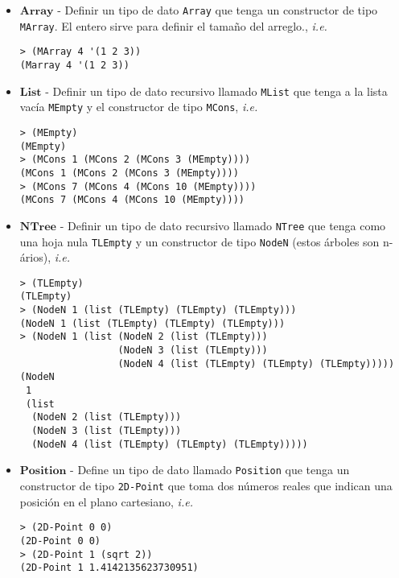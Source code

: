 \documentclass{article}
\begin{document}
\begin{itemize}
\item $\textbf{Array}$ - Definir un tipo de dato \texttt{Array}
  que tenga un constructor de tipo \texttt{MArray}. El entero sirve
  para definir el tamaño del arreglo., \textit{i.e.}
\begin{verbatim}
> (MArray 4 '(1 2 3))
(Marray 4 '(1 2 3))
\end{verbatim}

\item $\textbf{List}$ - Definir un tipo de dato recursivo llamado
  \texttt{MList} que tenga a la lista vacía \texttt{MEmpty} y el
  constructor de tipo \texttt{MCons}, \textit{i.e.}
\begin{verbatim}
> (MEmpty)
(MEmpty)
> (MCons 1 (MCons 2 (MCons 3 (MEmpty))))
(MCons 1 (MCons 2 (MCons 3 (MEmpty))))
> (MCons 7 (MCons 4 (MCons 10 (MEmpty))))
(MCons 7 (MCons 4 (MCons 10 (MEmpty))))
\end{verbatim}

\item $\textbf{NTree}$ - Definir un tipo de dato recursivo llamado
  \texttt{NTree} que tenga como una hoja nula \texttt{TLEmpty} y un
  constructor de tipo \texttt{NodeN} (estos árboles son n-ários), \textit{i.e.}
\begin{verbatim}
> (TLEmpty)
(TLEmpty)
> (NodeN 1 (list (TLEmpty) (TLEmpty) (TLEmpty)))
(NodeN 1 (list (TLEmpty) (TLEmpty) (TLEmpty)))
> (NodeN 1 (list (NodeN 2 (list (TLEmpty))) 
                 (NodeN 3 (list (TLEmpty))) 
                 (NodeN 4 (list (TLEmpty) (TLEmpty) (TLEmpty)))))
(NodeN
 1
 (list
  (NodeN 2 (list (TLEmpty)))
  (NodeN 3 (list (TLEmpty)))
  (NodeN 4 (list (TLEmpty) (TLEmpty) (TLEmpty)))))
\end{verbatim}

\item $\textbf{Position}$ - Define un tipo de dato llamado
  \texttt{Position} que tenga un constructor de tipo \texttt{2D-Point}
  que toma dos números reales que indican una posición
  en el plano cartesiano, \textit{i.e.}
\begin{verbatim}
> (2D-Point 0 0)
(2D-Point 0 0)
> (2D-Point 1 (sqrt 2))
(2D-Point 1 1.4142135623730951)
\end{verbatim}


\end{itemize}
\end{document}
